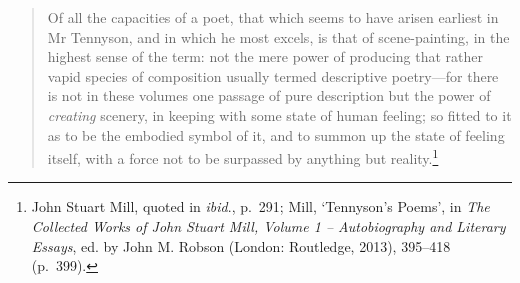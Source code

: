 \documentclass[]{article}
\begin{document}
\begin{quote}
\singlespacing Of all the capacities of a poet, that which seems to have
arisen earliest in Mr Tennyson, and in which he most excels, is that of
scene-painting, in the highest sense of the term: not the mere power of
producing that rather vapid species of composition usually termed
descriptive poetry—for there is not in these volumes one passage of pure
description but the power of \emph{creating} scenery, in keeping with
some state of human feeling; so fitted to it as to be the embodied
symbol of it, and to summon up the state of feeling itself, with a force
not to be surpassed by anything but reality.\footnote{John Stuart Mill,
  quoted in \emph{ibid}., p.~291; Mill, ‘Tennyson’s Poems’, in \emph{The
  Collected Works of John Stuart Mill, Volume 1 – Autobiography and
  Literary Essays}, ed. by John M. Robson (London: Routledge, 2013),
  395–418 (p.~399).}
\end{quote}
\end{document}
